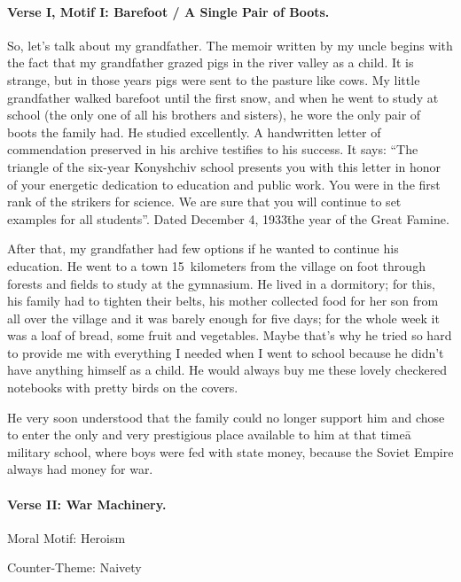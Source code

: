 \fugue

\paragraph{Verse I, Motif I: Barefoot / A Single Pair of Boots.}

So, let's talk about my grandfather. The memoir written by my uncle
begins with the fact that my grandfather grazed pigs in the river
valley as a child. It is strange, but in those years pigs were sent to
the pasture like cows. My little grandfather walked barefoot until the
first snow, and when he went to study at school (the only one of all
his brothers and sisters), he wore the only pair of boots the family
had. He studied excellently. A handwritten letter of commendation
preserved in his archive testifies to his success. It says: ``The
triangle of the six-year Konyshchiv school presents you with this
letter in honor of your energetic dedication to education and public
work. You were in the first rank of the strikers for science. We are
sure that you will continue to set examples for all students''. Dated
December 4, 1933\=the year of the Great Famine.

After that, my grandfather had few options if he wanted to continue
his education. He went to a town 15~kilometers from the village on
foot through forests and fields to study at the gymnasium. He lived in
a dormitory; for this, his family had to tighten their belts, his
mother collected food for her son from all over the village and it was
barely enough for five days; for the whole week it was a loaf of
bread, some fruit and vegetables. Maybe that's why he tried so hard
to provide me with everything I needed when I went to school because
he didn't have anything himself as a child. He would always buy me
these lovely checkered notebooks with pretty birds on the covers.

He very soon understood that the family could no longer support him
and chose to enter the only and very prestigious place available to
him at that time\=a military school, where boys were fed with state
money, because the Soviet Empire always had money for war.

\paragraph{Verse II: War Machinery.}\strut

Moral Motif: Heroism

Counter-Theme: Naivety

